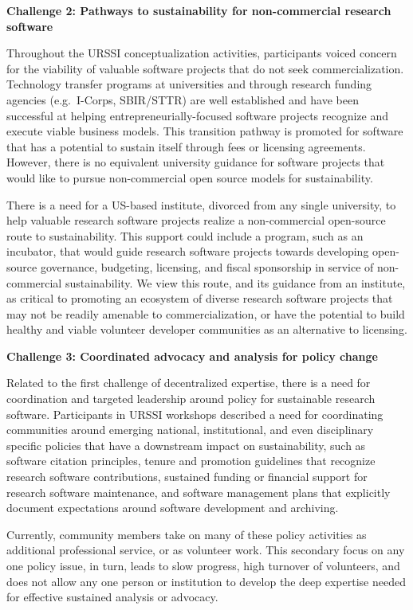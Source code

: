\documentclass[
]{book}
\begin{document}
\textbf{Challenge 2: Pathways to sustainability for non-commercial research software}

Throughout the URSSI conceptualization activities, participants voiced concern
for the viability of valuable software projects that do not seek
commercialization. Technology transfer programs at universities and through
research funding agencies (e.g.~I-Corps, SBIR/STTR) are well established
and have been successful at helping entrepreneurially-focused software projects
recognize and execute viable business models. This transition pathway is
promoted for software that has a potential to sustain itself through fees or
licensing agreements. However, there is no equivalent university guidance for
software projects that would like to pursue non-commercial open source models
for sustainability.

There is a need for a US-based institute, divorced from any single university,
to help valuable research software projects realize a non-commercial
open-source route to sustainability. This support could include a program, such as an
incubator, that would guide research software projects towards developing
open-source governance, budgeting, licensing, and fiscal sponsorship in service
of non-commercial sustainability. We view this route, and its guidance from an
institute, as critical to promoting an ecosystem of diverse research software
projects that may not be readily amenable to commercialization, or have the
potential to build healthy and viable volunteer developer communities as an
alternative to licensing.

\textbf{Challenge 3: Coordinated advocacy and analysis for policy change}

Related to the first challenge of decentralized expertise, there is a need
for coordination and targeted leadership around policy for sustainable
research software. Participants in URSSI workshops described a need for
coordinating communities around emerging national, institutional, and even
disciplinary specific policies that have a downstream impact on sustainability,
such as software citation principles, tenure and promotion guidelines that
recognize research software contributions, sustained funding or financial
support for research software maintenance, and software management plans
that explicitly document expectations around software development and archiving.

Currently, community members take on many of these policy activities as additional
professional service, or as volunteer work. This secondary focus on any
one policy issue, in turn, leads to slow progress, high turnover of volunteers,
and does not allow any one person or institution to develop the deep expertise
needed for effective sustained analysis or advocacy.
\end{document}

